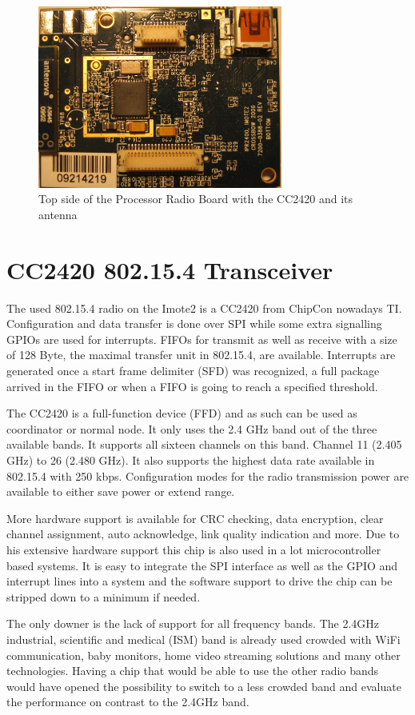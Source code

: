 \begin{figure}
  \begin{center}
    \includegraphics[height=6cm]{images/imote_top_cutted}
    \caption{Top side of the Processor Radio Board with the CC2420 and its antenna}
        \label{fig:imote2top}
  \end{center}
\end{figure}

\section{CC2420 802.15.4 Transceiver}
The used 802.15.4 radio on the Imote2 is a CC2420 from ChipCon nowadays TI.
Configuration and data transfer is done over SPI while some extra signalling
GPIOs are used for interrupts. FIFOs for transmit as well as receive with a size
of 128 Byte, the maximal transfer unit in 802.15.4, are available. Interrupts
are generated once a start frame delimiter (SFD) was recognized, a full package
arrived in the FIFO or when a FIFO is going to reach a specified threshold.

The CC2420 is a full-function device (FFD) and as such can be used as
coordinator or normal node. It only uses the 2.4 GHz band out of the three
available bands. It supports all sixteen channels on this band. Channel 11
(2.405 GHz) to 26 (2.480 GHz). It also supports the highest data rate available
in 802.15.4 with 250 kbps. Configuration modes for the radio transmission power
are available to either save power or extend range.

More hardware support is available for CRC checking, data encryption, clear
channel assignment, auto acknowledge, link quality indication and more. Due to
his extensive hardware support this chip is also used in a lot microcontroller
based systems. It is easy to integrate the SPI interface as well as the GPIO and
interrupt lines into a system and the software support to drive the chip can be
stripped down to a minimum if needed.

The only downer is the lack of support for all frequency bands. The 2.4GHz
industrial, scientific and medical (ISM) band is already used crowded with WiFi
communication, baby monitors, home video streaming solutions and many other
technologies. Having a chip that would be able to use the other radio bands
would have opened the possibility to switch to a less crowded band and evaluate
the performance on contrast to the 2.4GHz band.

